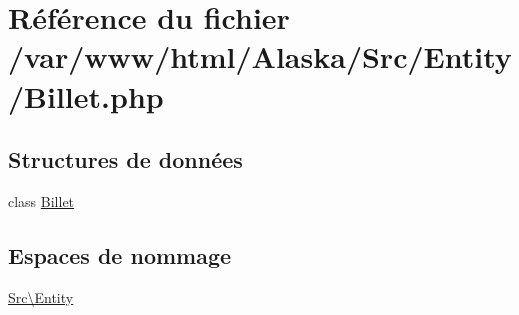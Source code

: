 \hypertarget{_billet_8php}{}\section{Référence du fichier /var/www/html/\+Alaska/\+Src/\+Entity/\+Billet.php}
\label{_billet_8php}
\subsection*{Structures de données}
\begin{DoxyCompactItemize}
\item 
class \hyperlink{class_src_1_1_entity_1_1_billet}{Billet}
\end{DoxyCompactItemize}
\subsection*{Espaces de nommage}
\begin{DoxyCompactItemize}
\item 
 \hyperlink{namespace_src_1_1_entity}{Src\textbackslash{}\+Entity}
\end{DoxyCompactItemize}
